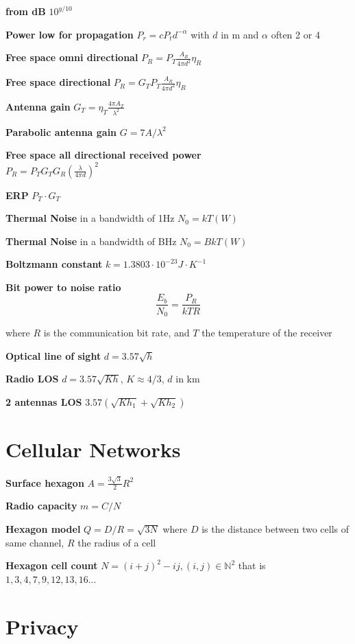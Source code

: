 \documentclass[10pt,twocolumn]{article}
\renewcommand{\l}{\left}
\renewcommand{\r}{\right}
\newcommand{\pfrac}[2]{\l(\frac{#1}{#2}\r)}
\renewcommand{\bf}{\textbf}
\newcommand{\bN}{\mathbb{N}}
\begin{document}
\bf{from dB} $10^{y/10}$

\textbf{Power low for propagation} $P_r = c P_t d^{-\alpha}$ with $d$ in m and $\alpha$ often 2 or 4

\textbf{Free space omni directional} $P_R = P_T \frac{A_R}{4\pi d^2}\eta_R$

\textbf{Free space directional} $P_R = G_T P_T \frac{A_R}{4\pi d^2}\eta_R$

\textbf{Antenna gain} $G_T =\eta_T \frac{4\pi A_T}{\lambda^2}$

\textbf{Parabolic antenna gain} $G=7A/\lambda^2$

\textbf{Free space all directional received power} \\$P_R = P_T G_T G_R \pfrac{\lambda}{4\pi d}^2$


\textbf{ERP} $P_T \cdot G_T$

\bf{Thermal Noise} in a bandwidth of 1Hz $N_0 = kT (W)$ 

\bf{Thermal Noise} in a bandwidth of BHz $N_0 = BkT (W)$ 

\bf{Boltzmann constant} $ k = 1.3803 \cdot 10^{-23} J\cdot K^{-1}$

\bf{Bit power to noise ratio}
\[
  \frac{E_b}{N_0}=\frac{P_R}{kTR}
\]

where $R$ is the communication bit rate, and $T$ the temperature of the receiver

\bf{Optical line of sight} $d = 3.57\sqrt h$

\bf{Radio LOS} $d = 3.57\sqrt {Kh}$, $K \approx 4/3$, $d$ in km

\bf{2 antennas LOS} $3.57(\sqrt{Kh_1} + \sqrt{Kh_2})$

\section{Cellular Networks}


\textbf{Surface hexagon} $A = \frac{3\sqrt 3} 2 R^2$

\bf{Radio capacity} $m = C/N$

\bf{Hexagon model} $Q=D/R = \sqrt{3N}$ where $D$ is the distance between two cells of same channel, $R$ the radius of a cell

\bf{Hexagon cell count} $N=(i+j)^2-ij, (i,j) \in \bN^2$ that is $1,3,4,7,9,12,13,16...$

\section{Privacy}
\end{document}
